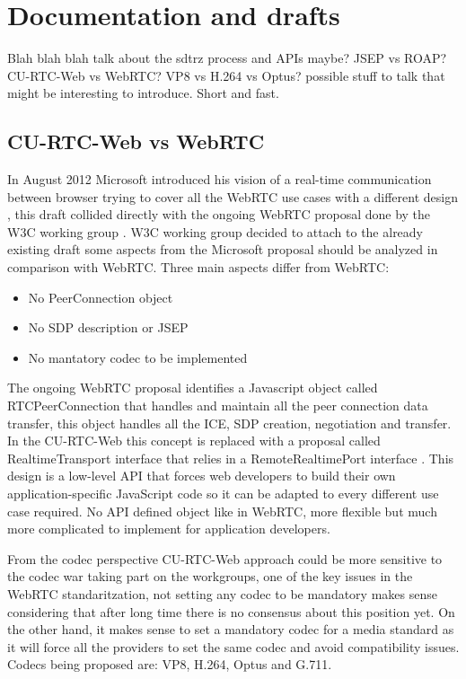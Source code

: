 \section{Documentation and drafts}

\thispagestyle{empty}

Blah blah blah talk about the sdtrz process and APIs maybe? JSEP vs ROAP? CU-RTC-Web vs WebRTC? VP8 vs H.264 vs Optus? possible stuff to talk that might be interesting to introduce. Short and fast.

\subsection{CU-RTC-Web vs WebRTC}
In August 2012 Microsoft introduced his vision of a real-time communication between browser trying to cover all the WebRTC use cases with a different design \cite{curtcweb}, this draft collided directly with the ongoing WebRTC proposal done by the W3C working group \cite{webrtcW3cgroup}. W3C working group decided to attach to the already existing draft some aspects from the Microsoft proposal should be analyzed in comparison with WebRTC. Three main aspects differ from WebRTC:
\begin{itemize}
	\item No PeerConnection object
	\item No SDP description or JSEP
	\item No mantatory codec to be implemented
\end{itemize}
The ongoing WebRTC proposal identifies a Javascript object called RTCPeerConnection that handles and maintain all the peer connection data transfer, this object handles all the ICE, SDP creation, negotiation and transfer. In the CU-RTC-Web this concept is replaced with a proposal called RealtimeTransport interface that relies in a RemoteRealtimePort interface \cite{realtimemedia}. This design is a low-level API that forces web developers to build their own application-specific JavaScript code so it can be adapted to every different use case required. No API defined object like in WebRTC, more flexible but much more complicated to implement for application developers.

From the codec perspective CU-RTC-Web approach could be more sensitive to the codec war taking part on the workgroups, one of the key issues in the WebRTC standaritzation, not setting any codec to be mandatory makes sense considering that after long time there is no consensus about this position yet. On the other hand, it makes sense to set a mandatory codec for a media standard as it will force all the providers to set the same codec and avoid compatibility issues. Codecs being proposed are: VP8, H.264, Optus and G.711.

